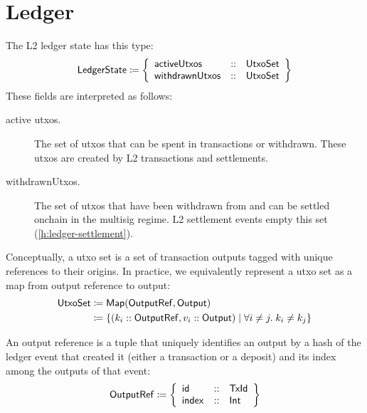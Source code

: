 \documentclass[../hydrozoa.tex]{subfiles}
\begin{document}
\section{Ledger}%
\label{h:l2-ledger}

The L2 ledger state has this type:
\begin{equation*}
  \mathsf{LedgerState} \coloneq \left\{
  \begin{array}{lll}
    \mathsf{activeUtxos} &::& \mathsf{UtxoSet} \\
    \mathsf{withdrawnUtxos} &::& \mathsf{UtxoSet}
  \end{array}\right\}
\end{equation*}
These fields are interpreted as follows:
\begin{description}
  \item[active utxos.] The set of utxos that can be spent in transactions or withdrawn.
    These utxos are created by L2 transactions and settlements.
  \item[withdrawnUtxos.] The set of utxos that have been withdrawn from  and can be settled onchain in the multisig regime.
    L2 settlement events empty this set (\cref{h:ledger-settlement}).
    
\end{description}

Conceptually, a utxo set is a set of transaction outputs tagged with unique references to their origins.
In practice, we equivalently represent a utxo set as a map from output reference to output:
\begin{equation*}
\begin{split}
  \mathsf{UtxoSet} &\coloneq \mathsf{Map(OutputRef, Output)} \\
    &\coloneq \left\{
      (k_i :: \mathsf{OutputRef}, v_i :: \mathsf{Output})
      \;\middle|\;
      \forall i \neq j.\; k_i \neq k_j
    \right\}
\end{split}
\end{equation*}

An output reference is a tuple that uniquely identifies an output by a hash of the ledger event that created it (either a transaction or a deposit) and its index among the outputs of that event:
\begin{equation*}
    \mathsf{OutputRef} \coloneq \left\{
    \begin{array}{lll}
      \mathsf{id} &::& \mathsf{TxId} \\
        \mathsf{index} &::& \mathsf{Int}
    \end{array} \right\}
\end{equation*}
\end{document}
